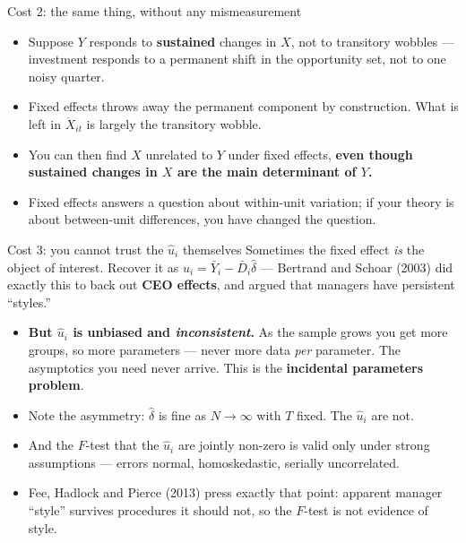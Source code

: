 \documentclass[
  11pt,
  ignorenonframetext,
  aspectratio=169,
]{beamer}
\providecommand{\tightlist}{%
  \setlength{\itemsep}{0pt}\setlength{\parskip}{0pt}}
\begin{document}
\begin{frame}{Cost 2: the same thing, without any mismeasurement}
\protect{}\label{cost-2-the-same-thing-without-any-mismeasurement}
\begin{itemize}
\tightlist
\item
  Suppose \(Y\) responds to \textbf{sustained} changes in \(X\), not to
  transitory wobbles --- investment responds to a permanent shift in the
  opportunity set, not to one noisy quarter.
\item
  Fixed effects throws away the permanent component by construction.
  What is left in \(\ddot X_{it}\) is largely the transitory wobble.
\item
  You can then find \(X\) unrelated to \(Y\) under fixed effects,
  \textbf{even though sustained changes in \(X\) are the main
  determinant of \(Y\).}
\end{itemize}

\vspace{0.3em}

\begin{itemize}
\tightlist
\item
  Fixed effects answers a question about within-unit variation; if your
  theory is about between-unit differences, you have changed the
  question.
\end{itemize}
\end{frame}

\begin{frame}{Cost 3: you cannot trust the \(\hat u_i\) themselves}
\protect{}\label{cost-3-you-cannot-trust-the-hat-u_i-themselves}
Sometimes the fixed effect \emph{is} the object of interest. Recover it
as \(\hat u_i = \bar Y_i - \bar D_i\hat\delta\) --- Bertrand and Schoar
(2003) did exactly this to back out \textbf{CEO effects}, and argued
that managers have persistent ``styles.''

\vspace{0.3em}

\begin{itemize}
\tightlist
\item
  \textbf{But \(\hat u_i\) is unbiased and \emph{inconsistent}.} As the
  sample grows you get more groups, so more parameters --- never more
  data \emph{per} parameter. The asymptotics you need never arrive. This
  is the \textbf{incidental parameters problem}.
\item
  Note the asymmetry: \(\hat\delta\) is fine as \(N \to \infty\) with
  \(T\) fixed. The \(\hat u_i\) are not.
\item
  And the \(F\)-test that the \(\hat u_i\) are jointly non-zero is valid
  only under strong assumptions --- errors normal, homoskedastic,
  serially uncorrelated.
\item
  Fee, Hadlock and Pierce (2013) press exactly that point: apparent
  manager ``style'' survives procedures it should not, so the \(F\)-test
  is not evidence of style.
\end{itemize}
\end{frame}
\end{document}
